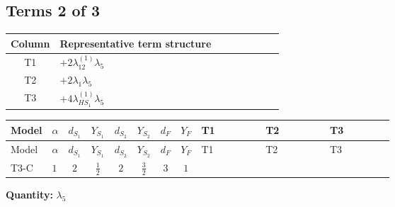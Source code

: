 \documentclass[8pt]{article}
\begin{document}
\begin{landscape}
\subsection*{Terms 2 of 3}
\begin{center}
\begin{tabular}{@{}c >{\raggedright\arraybackslash}p{0.82\linewidth}@{}}
\toprule
Column & Representative term structure \\
\midrule
T1 & \(\displaystyle +2 {\lambda_{12}^{(1)}} {\lambda_5}\) \\
\midrule
T2 & \(\displaystyle +2 {\lambda_1} {\lambda_5}\) \\
\midrule
T3 & \(\displaystyle +4 {\lambda_{HS_1}^{(1)}} {\lambda_5}\) \\
\midrule
\bottomrule
\end{tabular}
\end{center}
\smallskip
\tiny
\begin{longtable}{@{}llcccccc >{\raggedright\arraybackslash}p{0.21\linewidth} >{\raggedright\arraybackslash}p{0.21\linewidth} >{\raggedright\arraybackslash}p{0.21\linewidth}@{}}
\toprule
Model & $\alpha$ & $d_{S_1}$ & $Y_{S_1}$ & $d_{S_2}$ & $Y_{S_2}$ & $d_F$ & $Y_F$ & T1 & T2 & T3 \\
\midrule
\endfirsthead
\toprule
Model & $\alpha$ & $d_{S_1}$ & $Y_{S_1}$ & $d_{S_2}$ & $Y_{S_2}$ & $d_F$ & $Y_F$ & T1 & T2 & T3 \\
\midrule
\endhead
T3-C & $1$ & $2$ & $\frac{1}{2}$ & $2$ & $\frac{3}{2}$ & $3$ & $1$ & \scriptsize\adjustbox{max width=\linewidth}{$\begin{gathered} +2 {\lambda_{12}^{(1)}} {\lambda_5}\end{gathered}$} & \scriptsize\adjustbox{max width=\linewidth}{$\begin{gathered} +2 {\lambda_1} {\lambda_5}\end{gathered}$} & \scriptsize\adjustbox{max width=\linewidth}{$\begin{gathered} +4 {\lambda_{HS_1}^{(1)}} {\lambda_5}\end{gathered}$} \\
\midrule
\bottomrule
\end{longtable}
\clearpage
\noindent\textbf{Quantity: }$\lambda_5$\par\smallskip

\end{landscape}
\end{document}
